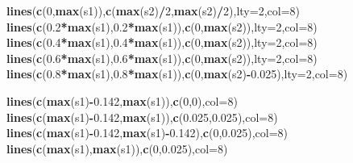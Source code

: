 \documentclass[]{article}
\newenvironment{Shaded}{\begin{snugshade}}{\end{snugshade}}
\newcommand{\DataTypeTok}[1]{\textcolor[rgb]{0.13,0.29,0.53}{#1}}
\newcommand{\DecValTok}[1]{\textcolor[rgb]{0.00,0.00,0.81}{#1}}
\newcommand{\FloatTok}[1]{\textcolor[rgb]{0.00,0.00,0.81}{#1}}
\newcommand{\KeywordTok}[1]{\textcolor[rgb]{0.13,0.29,0.53}{\textbf{#1}}}
\newcommand{\NormalTok}[1]{#1}
\newcommand{\OperatorTok}[1]{\textcolor[rgb]{0.81,0.36,0.00}{\textbf{#1}}}
\begin{document}
\begin{Shaded}
\begin{Highlighting}[]
\KeywordTok{lines}\NormalTok{(}\KeywordTok{c}\NormalTok{(}\DecValTok{0}\NormalTok{,}\KeywordTok{max}\NormalTok{(s1)),}\KeywordTok{c}\NormalTok{(}\KeywordTok{max}\NormalTok{(s2)}\OperatorTok{/}\DecValTok{2}\NormalTok{,}\KeywordTok{max}\NormalTok{(s2)}\OperatorTok{/}\DecValTok{2}\NormalTok{),}\DataTypeTok{lty=}\DecValTok{2}\NormalTok{,}\DataTypeTok{col=}\DecValTok{8}\NormalTok{)}
\KeywordTok{lines}\NormalTok{(}\KeywordTok{c}\NormalTok{(}\FloatTok{0.2}\OperatorTok{*}\KeywordTok{max}\NormalTok{(s1),}\FloatTok{0.2}\OperatorTok{*}\KeywordTok{max}\NormalTok{(s1)),}\KeywordTok{c}\NormalTok{(}\DecValTok{0}\NormalTok{,}\KeywordTok{max}\NormalTok{(s2)),}\DataTypeTok{lty=}\DecValTok{2}\NormalTok{,}\DataTypeTok{col=}\DecValTok{8}\NormalTok{)}
\KeywordTok{lines}\NormalTok{(}\KeywordTok{c}\NormalTok{(}\FloatTok{0.4}\OperatorTok{*}\KeywordTok{max}\NormalTok{(s1),}\FloatTok{0.4}\OperatorTok{*}\KeywordTok{max}\NormalTok{(s1)),}\KeywordTok{c}\NormalTok{(}\DecValTok{0}\NormalTok{,}\KeywordTok{max}\NormalTok{(s2)),}\DataTypeTok{lty=}\DecValTok{2}\NormalTok{,}\DataTypeTok{col=}\DecValTok{8}\NormalTok{)}
\KeywordTok{lines}\NormalTok{(}\KeywordTok{c}\NormalTok{(}\FloatTok{0.6}\OperatorTok{*}\KeywordTok{max}\NormalTok{(s1),}\FloatTok{0.6}\OperatorTok{*}\KeywordTok{max}\NormalTok{(s1)),}\KeywordTok{c}\NormalTok{(}\DecValTok{0}\NormalTok{,}\KeywordTok{max}\NormalTok{(s2)),}\DataTypeTok{lty=}\DecValTok{2}\NormalTok{,}\DataTypeTok{col=}\DecValTok{8}\NormalTok{)}
\KeywordTok{lines}\NormalTok{(}\KeywordTok{c}\NormalTok{(}\FloatTok{0.8}\OperatorTok{*}\KeywordTok{max}\NormalTok{(s1),}\FloatTok{0.8}\OperatorTok{*}\KeywordTok{max}\NormalTok{(s1)),}\KeywordTok{c}\NormalTok{(}\DecValTok{0}\NormalTok{,}\KeywordTok{max}\NormalTok{(s2)}\OperatorTok{-}\FloatTok{0.025}\NormalTok{),}\DataTypeTok{lty=}\DecValTok{2}\NormalTok{,}\DataTypeTok{col=}\DecValTok{8}\NormalTok{)}

\KeywordTok{lines}\NormalTok{(}\KeywordTok{c}\NormalTok{(}\KeywordTok{max}\NormalTok{(s1)}\OperatorTok{-}\FloatTok{0.142}\NormalTok{,}\KeywordTok{max}\NormalTok{(s1)),}\KeywordTok{c}\NormalTok{(}\DecValTok{0}\NormalTok{,}\DecValTok{0}\NormalTok{),}\DataTypeTok{col=}\DecValTok{8}\NormalTok{)}
\KeywordTok{lines}\NormalTok{(}\KeywordTok{c}\NormalTok{(}\KeywordTok{max}\NormalTok{(s1)}\OperatorTok{-}\FloatTok{0.142}\NormalTok{,}\KeywordTok{max}\NormalTok{(s1)),}\KeywordTok{c}\NormalTok{(}\FloatTok{0.025}\NormalTok{,}\FloatTok{0.025}\NormalTok{),}\DataTypeTok{col=}\DecValTok{8}\NormalTok{)}
\KeywordTok{lines}\NormalTok{(}\KeywordTok{c}\NormalTok{(}\KeywordTok{max}\NormalTok{(s1)}\OperatorTok{-}\FloatTok{0.142}\NormalTok{,}\KeywordTok{max}\NormalTok{(s1)}\OperatorTok{-}\FloatTok{0.142}\NormalTok{),}\KeywordTok{c}\NormalTok{(}\DecValTok{0}\NormalTok{,}\FloatTok{0.025}\NormalTok{),}\DataTypeTok{col=}\DecValTok{8}\NormalTok{)}
\KeywordTok{lines}\NormalTok{(}\KeywordTok{c}\NormalTok{(}\KeywordTok{max}\NormalTok{(s1),}\KeywordTok{max}\NormalTok{(s1)),}\KeywordTok{c}\NormalTok{(}\DecValTok{0}\NormalTok{,}\FloatTok{0.025}\NormalTok{),}\DataTypeTok{col=}\DecValTok{8}\NormalTok{)}


\end{Highlighting}
\end{Shaded}
\end{document}
